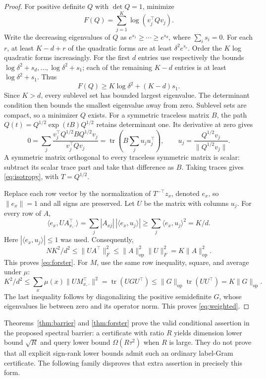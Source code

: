 \documentclass[11pt]{article}
\DeclareMathOperator{\tr}{tr}
\newcommand{\1}{\mathbf 1}
\newcommand{\op}{\mathrm{op}}
\begin{document}
\begin{proof}
For positive definite $Q$ with $\det Q=1$, minimize
\[
 F(Q)=\sum_{j=1}^K\log(v_j^\top Qv_j).
\]
Write the decreasing eigenvalues of $Q$ as $e^{s_1}\geq\cdots\geq e^{s_d}$, where $\sum_i s_i=0$. For each $r$, at least $K-d+r$ of the quadratic forms are at least $\delta^2e^{s_r}$. Order the $K$ log quadratic forms increasingly. For the first $d$ entries use respectively the bounds
$\log\delta^2+s_d,\ldots,\log\delta^2+s_1$; each of the remaining $K-d$ entries is at least $\log\delta^2+s_1$. Thus
\[
 F(Q)\geq K\log\delta^2+(K-d)s_1.
\]
Since $K>d$, every sublevel set has bounded largest eigenvalue. The determinant condition then bounds the smallest eigenvalue away from zero. Sublevel sets are compact, so a minimizer $Q$ exists.
For a symmetric traceless matrix $B$, the path
$Q(t)=Q^{1/2}\exp(tB)Q^{1/2}$ retains determinant one. Its derivative at zero gives
\[
 0=\sum_j\frac{v_j^\top Q^{1/2}BQ^{1/2}v_j}{v_j^\top Qv_j}
   =\tr\left(B\sum_j u_ju_j^\top\right),
 \qquad u_j=\frac{Q^{1/2}v_j}{\|Q^{1/2}v_j\|}.
\]
A symmetric matrix orthogonal to every traceless symmetric matrix is scalar: subtract its scalar trace part and take that difference as $B$. Taking traces gives \eqref{eq:isotropy}, with $T=Q^{1/2}$.

Replace each row vector by the normalization of $T^{-\top}z_x$, denoted $e_x$, so $\|e_x\|=1$ and all signs are preserved. Let $U$ be the matrix with columns $u_j$. For every row of $A$,
\[
 \langle e_x,UA_{x,\cdot}^{\top}\rangle
 =\sum_j |A_{xj}|\,|\langle e_x,u_j\rangle|
 \geq\sum_j\langle e_x,u_j\rangle^2=K/d.
\]
Here $|\langle e_x,u_j\rangle|\leq1$ was used. Consequently,
\[
 NK^2/d^2\leq\|UA^\top\|_F^2
 \leq\|A\|_\op^2\|U\|_F^2=K\|A\|_\op^2.
\]
This proves \eqref{eq:forster}. For $M$, use the same row inequality, square, and average under $\mu$:
\[
 K^2/d^2\leq\sum_x\mu(x)\|UM_{x,\cdot}^{\top}\|^2
 =\tr(UGU^\top)\leq\|G\|_\op\tr(UU^\top)=K\|G\|_\op.
\]
The last inequality follows by diagonalizing the positive semidefinite $G$, whose eigenvalues lie between zero and its operator norm. This proves \eqref{eq:weighted}.
\end{proof}

Theorems~\ref{thm:barrier} and \ref{thm:forster} prove the valid conditional assertion in the proposed spectral barrier: a certificate with ratio $R$ yields dimension lower bound $\sqrt R$ and query lower bound $\Omega(R\tau^2)$ when $R$ is large. They do not prove that all explicit sign-rank lower bounds admit such an ordinary label-Gram certificate. The following family disproves that extra assertion in precisely this form.
\end{document}
